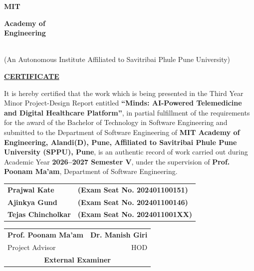 \documentclass[12pt,a4paper]{report}
\begin{document}
\cleardoublepage

\thispagestyle{empty}
\begin{center}
    {\Huge \textbf{MIT}} \quad \vline \quad 
    \parbox[c]{4.2cm}{\large \textbf{Academy of}\\\large \textbf{Engineering}}
    \\[0.2cm]
    {\footnotesize (An Autonomous Institute Affiliated to Savitribai Phule Pune University)}
    
    \vspace{1.2cm}
    {\large \bfseries \underline{CERTIFICATE}}
\end{center}

\vspace{0.8cm}
\noindent It is hereby certified that the work which is being presented in the Third Year Minor Project-Design Report entitled \textbf{“Minds: AI-Powered Telemedicine and Digital Healthcare Platform”}, in partial fulfillment of the requirements for the award of the Bachelor of Technology in Software Engineering and submitted to the Department of Software Engineering of \textbf{MIT Academy of Engineering, Alandi(D), Pune, Affiliated to Savitribai Phule Pune University (SPPU), Pune}, is an authentic record of work carried out during Academic Year \textbf{2026--2027 Semester V}, under the supervision of \textbf{Prof. Poonam Ma'am}, Department of Software Engineering.

\vspace{1.2cm}
\begin{tabular}{p{6.8cm} p{6.8cm}}
    \textbf{Prajwal Kate} & \textbf{(Exam Seat No. 202401100151)} \\
    \textbf{Ajinkya Gund} & \textbf{(Exam Seat No. 202401100146)} \\
    \textbf{Tejas Chincholkar} & \textbf{(Exam Seat No. 2024011001XX)} \\
\end{tabular}

\vspace{3.2cm}
\noindent
\begin{tabular*}{\textwidth}{@{\extracolsep{\fill}}lr}
    \textbf{Prof. Poonam Ma'am} & \textbf{Dr. Manish Giri} \\
    Project Advisor & HOD \\[2.5cm]
    \multicolumn{2}{c}{\textbf{External Examiner}}
\end{tabular*}
\end{document}
